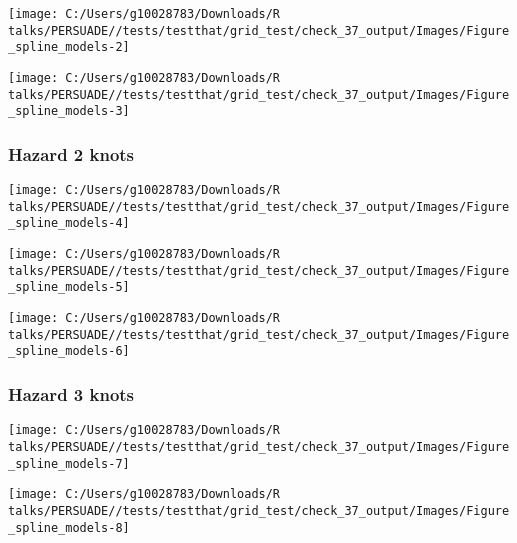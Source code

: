 \documentclass[
]{article}
\begin{document}
\begin{flushleft}\texttt{[image: C:/Users/g10028783/Downloads/R talks/PERSUADE//tests/testthat/grid\_test/check\_37\_output/Images/Figure\_spline\_models-2]} \end{flushleft}

\begin{flushleft}\texttt{[image: C:/Users/g10028783/Downloads/R talks/PERSUADE//tests/testthat/grid\_test/check\_37\_output/Images/Figure\_spline\_models-3]} \end{flushleft}

\clearpage

\subsubsection{Hazard 2 knots}\label{hazard-2-knots}

\begin{flushleft}\texttt{[image: C:/Users/g10028783/Downloads/R talks/PERSUADE//tests/testthat/grid\_test/check\_37\_output/Images/Figure\_spline\_models-4]} \end{flushleft}

\begin{flushleft}\texttt{[image: C:/Users/g10028783/Downloads/R talks/PERSUADE//tests/testthat/grid\_test/check\_37\_output/Images/Figure\_spline\_models-5]} \end{flushleft}

\begin{flushleft}\texttt{[image: C:/Users/g10028783/Downloads/R talks/PERSUADE//tests/testthat/grid\_test/check\_37\_output/Images/Figure\_spline\_models-6]} \end{flushleft}

\clearpage

\subsubsection{Hazard 3 knots}\label{hazard-3-knots}

\begin{flushleft}\texttt{[image: C:/Users/g10028783/Downloads/R talks/PERSUADE//tests/testthat/grid\_test/check\_37\_output/Images/Figure\_spline\_models-7]} \end{flushleft}

\begin{flushleft}\texttt{[image: C:/Users/g10028783/Downloads/R talks/PERSUADE//tests/testthat/grid\_test/check\_37\_output/Images/Figure\_spline\_models-8]} \end{flushleft}
\end{document}
